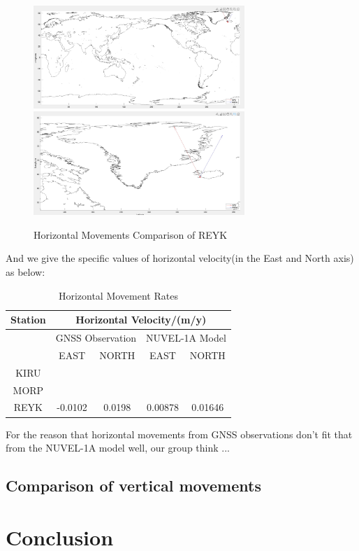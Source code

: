 \documentclass{article}
\begin{document}
  \begin{figure}[H]
    \centering
    {
    \includegraphics[width=8cm]{../result/re_figure/fig_REYK/截屏/figure4_new.jpg}}
    \hspace{3pt}    
    {
    \includegraphics[width=8cm]{../result/re_figure/fig_REYK/截屏/figure4(zoomup).jpg}}
    \caption{Horizontal Movements Comparison of REYK}
    \label{fig:Vel_REYK}
  \end{figure}

And we give the specific values of horizontal velocity(in the East and North axis) as below:
\vspace{6pt}
\begin{table}[htbp]
  \centering
  \caption{Horizontal Movement Rates}
    \begin{tabular}{ccc|cc}
    \large Station & \multicolumn{4}{c}{\large Horizontal Velocity/(m/y)} \\[5pt]
    \midrule
          & \multicolumn{2}{c}{GNSS Observation} & \multicolumn{2}{c}{NUVEL-1A Model} \\[3pt]
          & EAST  & \multicolumn{1}{c}{NORTH} & EAST  &  NORTH \\[4pt]
    \large KIRU  &       &       &       &  \\[4pt]
    \large MORP  &       &       &       &  \\[4pt]
    \large REYK  & -0.0102 & 0.0198 &  0.00878 & 0.01646 \\
    \end{tabular}%
  \label{tab:addlabel}%
\end{table}%

For the reason that horizontal movements from GNSS observations don't fit that from the NUVEL-1A model well,
our group think ...




\subsection{Comparison of vertical movements}



\section{Conclusion}
\end{document}
